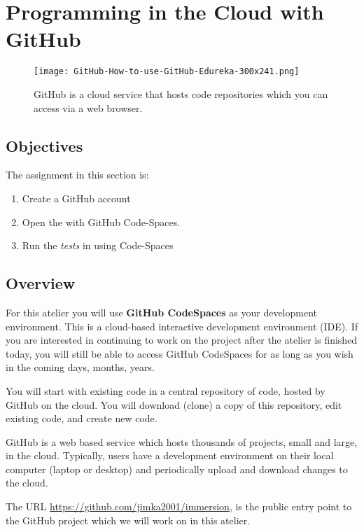 \section{Programming in the Cloud with GitHub}
\label{sec.github}


\begin{figure}[h]
  \centering
  \texttt{[image: GitHub-How-to-use-GitHub-Edureka-300x241.png]}
  \caption{GitHub is a cloud service that hosts code repositories which 
    you can access via a web browser.}
\end{figure}

\subsection{Objectives}
The assignment in this section is:
\begin{enumerate}
\item Create a GitHub account
\item Open the  with GitHub Code-Spaces.
\item Run the \emph{tests}  in using Code-Spaces
\end{enumerate}

\subsection{Overview}

For this atelier you will use \textbf{GitHub CodeSpaces} as your
development environment.  This is a cloud-based interactive
development environment (IDE).  If you are interested in continuing to
work on the project after the atelier is finished today, you will
still be able to access GitHub CodeSpaces for as long as you wish in
the coming days, months, years.



You will start with existing code in a central repository of code, hosted by
GitHub on the cloud.  You will download (clone) a copy of this
repository, edit existing code, and create new code.

GitHub is a web based service which hosts thousands of projects, small
and large, in the cloud.  Typically, users have a development
environment on their local computer (laptop or desktop) and
periodically upload and download changes to the cloud.

The URL \url{https://github.com/jimka2001/immersion}, is the public
entry point to the GitHub project which we will work on in this
atelier.

